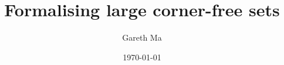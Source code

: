 \documentclass{article}[11px]
\title{Formalising large corner-free sets}
\author{Gareth Ma}
\date{\today}
\begin{document}
 \maketitle

\begin{abstract}
  ~\cite{GreenTao12} \lipsum[1]
\end{abstract}

\tableofcontents

\pagebreak







% 
% 
% 
% 
% 


% 



\clearpage
\printbibliography
\end{document}
